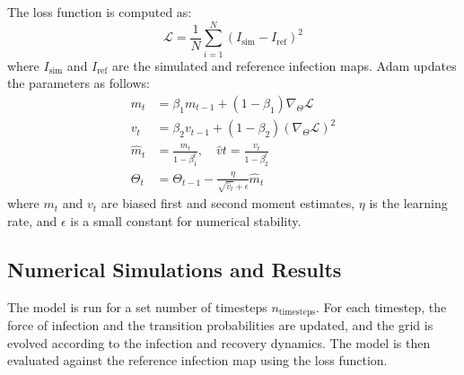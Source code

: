 \documentclass[12pt]{article}
\begin{document}
The loss function is computed as:
\[
\mathcal{L}= \frac{1}{N} \sum_{i=1}^{N} (I_{\text{sim}} - I_{\text{ref}})^2
\]
where $I_{\text{sim}}$ and $I_{\text{ref}}$ are the simulated and reference infection maps. Adam updates the parameters as follows:
\begin{align*}
m_t &= \beta_1 m_{t-1} + (1 - \beta_1) \nabla_\Theta \mathcal{L} \\
v_t &= \beta_2 v_{t-1} + (1 - \beta_2) (\nabla_\Theta \mathcal{L})^2 \\
\hat{m}_t &= \frac{m_t}{1 - \beta_1^t}, \quad \hat{v}t = \frac{v_t}{1 - \beta_2^t} \\
\Theta_t &= \Theta_{t-1} - \frac{\eta}{\sqrt{\hat{v}_t} + \epsilon} \hat{m}_t
\end{align*}
where $m_t$ and $v_t$ are biased first and second moment estimates, $\eta$ is the learning rate, and $\epsilon$ is a small constant for numerical stability.
\subsection{Numerical Simulations and Results}
The model is run for a set number of timesteps $n_{\text{timesteps}}$. For each timestep, the force of infection and the transition probabilities are updated, and the grid is evolved according to the infection and recovery dynamics. The model is then evaluated against the reference infection map using the loss function.
\end{document}
